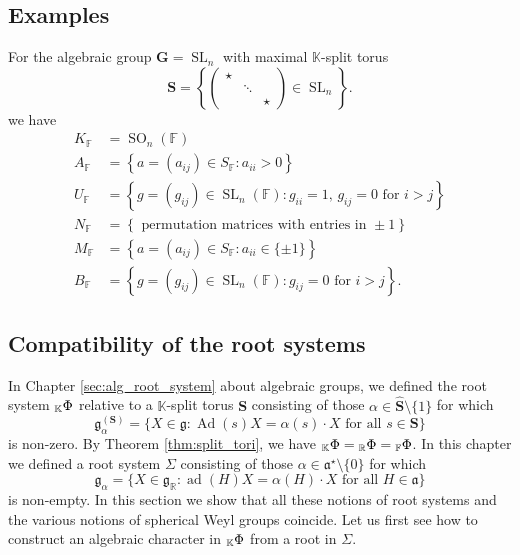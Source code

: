 \documentclass[12pt]{amsart}
\newcommand{\F}{\mathbb{F} }
\newcommand{\R}{\mathbb{R} }
\newcommand{\K}{\mathbb{K}}
\newcommand{\frakg}{\mathfrak{g}}
\newcommand{\fraka}{\mathfrak{a}}
\newcommand{\bG}{\mathbf{G}}
\newcommand{\bS}{\mathbf{S}}
\newcommand{\KPhi}{\vphantom{\Phi}_{\K}\Phi}
\newcommand{\RPhi}{\vphantom{\Phi}_{\R}\Phi}
\newcommand{\FPhi}{\vphantom{\Phi}_{\F}\Phi}
\numberwithin{equation}{section}
\theoremstyle{remark} %
\begin{document}
\subsection{Examples}

For the algebraic group $\bG = \operatorname{SL}_n$ with maximal $\K$-split torus
$$
\bS = \left\{ \begin{pmatrix}
	\star & & \\ & \ddots & \\ && \star
\end{pmatrix} \in \operatorname{SL}_n \right\}.
$$
we have
\begin{align*}
	K_\F &= \operatorname{SO}_n(\F) \\
	A_{\F} &= \left\{ a = (a_{ij}) \in S_{\F} \colon a_{ii}>0   \right\} \\
	U_{\F} &= \left\{g=(g_{ij}) \in \operatorname{SL}_{n}(\F) \colon  g_{ii}= 1, \, g_{ij} = 0 \text{ for } i>j  \right\} \\
	N_{\F} &= \left\{ \text{ permutation matrices with entries in }\pm 1 \right\} \\
	M_{\F} & = \left\{ a=(a_{ij}) \in S_{\F} \colon a_{ii} \in \{ \pm 1\}    \right\} \\
	B_{\F} &= \left\{ g = (g_{ij}) \in \operatorname{SL}_n(\F) \colon g_{ij} = 0 \text{ for } i > j \right\}.
\end{align*}

\subsection{Compatibility of the root systems}\label{sec:compatibility}

In Chapter \ref{sec:alg_root_system} about algebraic groups, we defined the root system $\KPhi$ relative to a $\K$-split torus $\bS$ consisting of those $\alpha \in \hat{\bS}\setminus \{1\}$ for which 
$$
\frakg_{\alpha}^{(\bS)} = \{X \in \frakg \colon \operatorname{Ad}(s)X = \alpha(s)\cdot X \text{ for all } s \in \bS \}
$$
is non-zero. By Theorem \ref{thm:split_tori}, we have $\KPhi = \RPhi = \FPhi$. In this chapter we  defined a root system $\Sigma$ consisting of those $\alpha \in \fraka^{\star}\setminus \{0\}$ for which
$$
\frakg_\alpha = \{ X \in \frakg_{\R} \colon \operatorname{ad}(H)X = \alpha(H) \cdot X \text{ for all } H \in \fraka \}
$$
is non-empty. In this section we show that all these notions of root systems and the various notions of spherical Weyl groups coincide. Let us first see how to construct an algebraic character in $\KPhi$ from a root in $\Sigma$.
\end{document}
